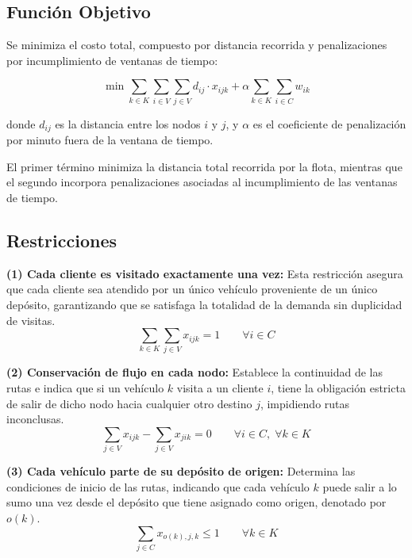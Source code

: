 \documentclass[letter, 10pt, dvipdfmx]{article}
\begin{document}
\subsection{Función Objetivo}

Se minimiza el costo total, compuesto por distancia recorrida y penalizaciones por incumplimiento de ventanas de tiempo:

\begin{equation}
  \min \sum_{k \in K} \sum_{i \in V} \sum_{j \in V} d_{ij} \cdot x_{ijk} + \alpha \sum_{k \in K} \sum_{i \in C} w_{ik}
\end{equation}

donde $d_{ij}$ es la distancia entre los nodos $i$ y $j$, y $\alpha$ es el coeficiente de penalización por minuto fuera de la ventana de tiempo.

El primer término minimiza la distancia total recorrida por la flota, mientras que el segundo incorpora penalizaciones asociadas al incumplimiento de las ventanas de tiempo.

\subsection{Restricciones}

\textbf{(1) Cada cliente es visitado exactamente una vez:} Esta restricción asegura que cada cliente sea atendido por un único vehículo proveniente de un único depósito, garantizando que se satisfaga la totalidad de la demanda sin duplicidad de visitas.
\begin{equation}
  \sum_{k \in K} \sum_{j \in V} x_{ijk} = 1 \qquad \forall i \in C
\end{equation}

\textbf{(2) Conservación de flujo en cada nodo:} Establece la continuidad de las rutas e indica que si un vehículo $k$ visita a un cliente $i$, tiene la obligación estricta de salir de dicho nodo hacia cualquier otro destino $j$, impidiendo rutas inconclusas.
\begin{equation}
  \sum_{j \in V} x_{ijk} - \sum_{j \in V} x_{jik} = 0 \qquad \forall i \in C,\; \forall k \in K
\end{equation}

\textbf{(3) Cada vehículo parte de su depósito de origen:} Determina las condiciones de inicio de las rutas, indicando que cada vehículo $k$ puede salir a lo sumo una vez desde el depósito que tiene asignado como origen, denotado por $o(k)$.
\begin{equation}
  \sum_{j \in C} x_{o(k),j,k} \leq 1 \qquad \forall k \in K
\end{equation}
\end{document}
